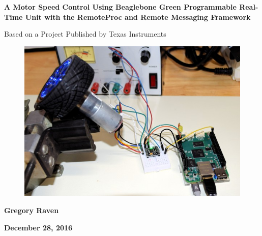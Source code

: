 \thispagestyle{empty}
{\centering\bfseries\color{black}\Huge
A Motor Speed Control Using Beaglebone Green Programmable Real-Time Unit with the RemoteProc and Remote Messaging Framework

Based on a Project Published by Texas Instruments
\par}

\bigskip

\begin{figure}
	\centering
	\includegraphics[width=\textwidth]{photos/intro_view}
\end{figure}

\bigskip
{\centering\bfseries\Large
Gregory Raven
\par}


\bigskip
{\centering\bfseries\LARGE
December 28, 2016
\par}



